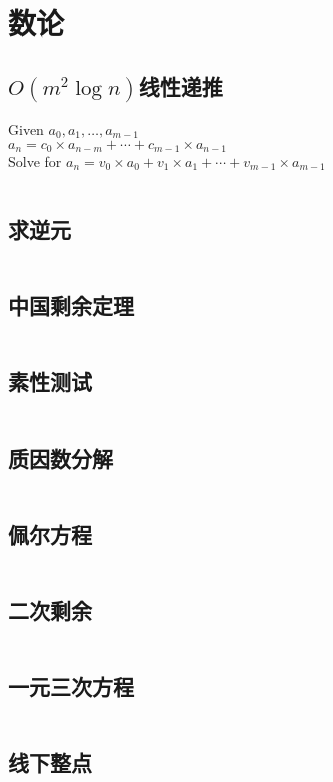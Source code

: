 \section{数论}
\subsection{$O(m^2\log n)$线性递推}
Given $a_0, a_1, \ldots, a_{m - 1}$\\
	$a_n = c_0 \times a_{n - m} + \cdots + c_{m - 1} \times a_{n - 1}$\\
	Solve for $a_n = v_0 \times a_0 + v_1 \times a_1 + \cdots + v_{m - 1} \times a_{m - 1}$\\
\inputminted{cpp}{\source/number-theory/linear-recurrence.cpp}
\subsection{求逆元}
\inputminted{cpp}{\source/number-theory/get-inversion.cpp}
\subsection{中国剩余定理}
\inputminted{cpp}{\source/number-theory/chinese-remainder-theorem.cpp}
\subsection{素性测试}
\inputminted{cpp}{\source/number-theory/primality-test.cpp}
\subsection{质因数分解}
\inputminted{cpp}{\source/number-theory/pollards-rho-algorithm.cpp}
\subsection{佩尔方程}
\inputminted{java}{\source/number-theory/Pell.java}
\subsection{二次剩余}
\inputminted{cpp}{\source/number-theory/square.cpp}
\subsection{一元三次方程}
\inputminted{cpp}{\source/number-theory/cubic-polynomial.cpp}
\subsection{线下整点}
\inputminted{cpp}{\source/number-theory/integer-lattice-under-segment.cpp}
